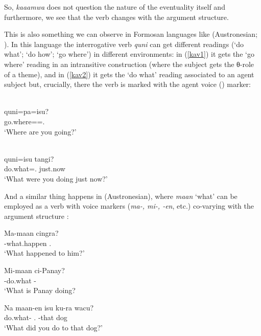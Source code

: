 \documentclass[output=paper]{langsci/langscibook}
\begin{document}
So, \emph{kaaamwa} does not question the nature of the eventuality itself and
furthermore, we see that the verb changes with the argument structure.

This is also something we can observe in Formosan languages like 
(Austronesian; \citealt[186]{lin2012}). In this language the interrogative verb
\emph{quni} can get different readings (`do what'; `do how'; `go where') in
different environments: in (\ref{kav1}) it gets the \enquote*{go where} reading in
an intransitive construction (where the subject gets the θ-role of a theme), and in (\ref{kav2}) it gets the \enquote*{do what}
reading associated to an agent subject but, crucially, there the verb is
marked with the agent voice (\Av{}) marker:

\begin{exe}
    \ex \label{kav1} \\
\gll quni=pa=isu?\\
go.where=\Fut{}=\Ssg.\Abs{}\\
\glt `Where are you going?'

\ex \label{kav2} \\
\gll quni=isu tangi?\\
\tuple{\Av}do.what=\Ssg.\Abs{} just.now\\
\glt `What were you doing just now?'
\end{exe}

And a similar thing happens in  (Austronesian), where \emph{maan} `what'
can be employed as a verb with voice markers (\emph{ma-, mi-, -en}, etc.)
co-varying with the argument structure \citep[192]{lin2012}:

\begin{exe}
\ex \label{amis1}
\sn\gll Ma-maan cingra?\\
\Av{}-what.happen \Ssg.\Abs{}\\
\glt `What happened to him?'

\ex \label{amis2}
\sn\gll Mi-maan ci-Panay?\\
\Av{}-do.what \Ncm{}-\Pn{}\\
\glt `What is Panay doing?

\ex \label{amis3}
\sn\gll Na maan-en isu ku-ra wacu?\\
\Pst{} do.what-\Pv{} \Ssg.\Erg{} \Abs{}-that dog\\
\glt `What did you do to that dog?'
\end{exe}
\end{document}
